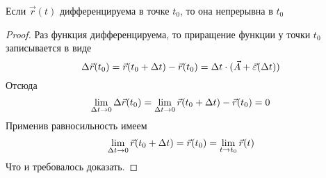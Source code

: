 \begin{lemma}
	Если $\vec{r}(t)$ дифференцируема в точке $t_0$, то она непрерывна в $t_0$
\end{lemma}

\begin{proof}
	Раз функция дифференцируема, то приращение функции у точки $t_0$ записывается в виде
	\[
		\Delta\vec{r}(t_0) = \vec{r}(t_0 + \Delta t) - \vec{r}(t_0) = \Delta t \cdot (\vec{A} + \vec{\varepsilon}(\Delta t))
	\]
	Отсюда
	\[
		\lim\limits_{\Delta t \to 0} \Delta\vec{r}(t_0) = \lim\limits_{\Delta t \to 0} \vec{r}(t_0 + \Delta t) - \vec{r}(t_0) = 0
	\]
	Применив равносильность имеем
	\[
		\lim\limits_{\Delta t \to 0} \vec{r}(t_0 + \Delta t) = \vec{r}(t_0) = \lim\limits_{t \to t_0} \vec{r}(t)
	\]
	Что и требовалось доказать.
\end{proof}